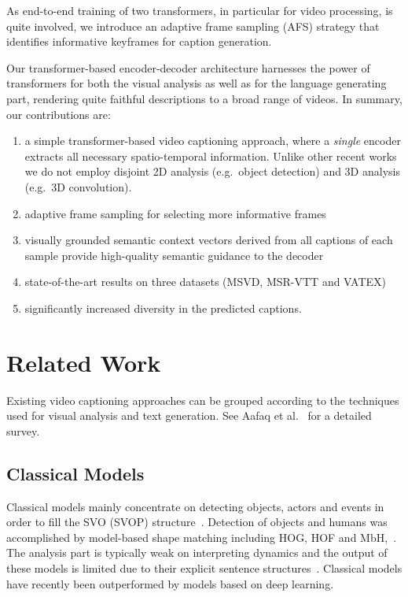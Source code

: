 \documentclass[runningheads,table]{llncs}
\begin{document}
As end-to-end training of two transformers, in particular for video processing, is quite involved, we introduce an adaptive frame sampling (AFS) strategy that identifies informative keyframes for caption generation.

Our transformer-based encoder-decoder architecture harnesses the power of transformers for both the visual analysis as well as for the language generating part, rendering quite faithful descriptions to a broad range of videos. In summary, our contributions are:
\begin{enumerate}[label=\alph*)]
	\item a simple transformer-based video captioning approach, where a \emph{single} encoder extracts all necessary spatio-temporal information. Unlike other recent works we do not employ disjoint 2D analysis (e.g.\ object detection) and 3D analysis (e.g.\ 3D convolution).
\item adaptive frame sampling for selecting more informative frames 
	\item visually grounded semantic context vectors derived from all captions of each sample provide high-quality semantic guidance to the decoder
	\item state-of-the-art results on three datasets (MSVD, MSR-VTT and VATEX)
    \item significantly increased diversity in the predicted captions.
\end{enumerate}
 \section{Related Work}
Existing video captioning approaches can be grouped according to the techniques used for visual analysis and text generation. See Aafaq et al.\ \cite{aafaq2019survey} for a detailed survey.

\subsection{Classical Models}


Classical models mainly concentrate on detecting objects, actors and events in order to fill the SVO (SVOP) structure~\cite{thomason2014integrating}. Detection of objects and humans was accomplished by model-based shape matching including HOG, HOF and MbH,~\cite{dalal2006human,wang2009evaluation,wang2009hog}. 
The analysis part is typically weak on interpreting dynamics and the output of these models is limited due to their explicit sentence structures~\cite{kojima2002natural,khan2011human,lee2008save,guadarrama2013youtube2text,krishnamoorthy2013generating}. Classical models have recently been outperformed by models based on deep learning. 
\end{document}
